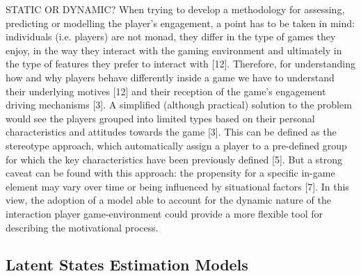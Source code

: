 STATIC OR DYNAMIC?
When trying to develop a methodology for assessing, predicting or modelling the player’s engagement, a point has to be taken in mind: individuals (i.e. players) are not monad, they differ in the type of games they enjoy, in the way they interact with the gaming environment and ultimately in the type of features they prefer to interact with [12]. Therefore, for understanding how and why players behave differently inside a game we have to understand their underlying motives [12] and their reception of the game’s engagement driving mechanisms [3]. A simplified (although practical) solution to the problem would see the players grouped into limited types based on their personal characteristics and attitudes towards the game [3]. This can be defined as the stereotype approach, which automatically assign a player to a pre-defined group for which the key characteristics have been previously defined [5]. But a strong caveat can be found with this approach: the propensity for a specific in-game element may vary over time or being influenced by situational factors [7]. In this view, the adoption of a model able to account for the dynamic nature of the interaction player game-environment could provide a more flexible tool for describing the motivational process.

\subsection{Latent States Estimation Models}
\label{latent_estimation}
\lorem
